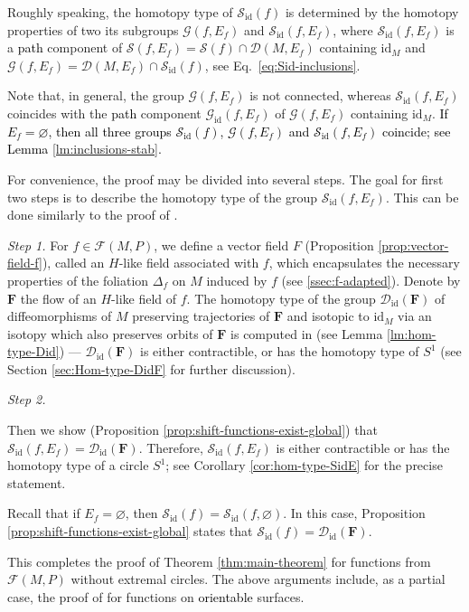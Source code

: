 \documentclass[10pt,reqno]{amsart}
\newcommand{\bfF}{\mathbf{F}}
\newcommand{\Sid}{\mathcal{S}_{\id}(f)}
\newcommand{\F}{\mathcal{F}(M,P)}
\newcommand{\id}{\mathrm{id}}
\newcommand{\textr}[1]{\textcolor{black}{#1}}
\begin{document}
{Roughly speaking, the homotopy type of $\Sid$ is determined by the homotopy properties of  two its subgroups
$\mathcal{G}(f,E_f)$ and $\mathcal{S}_{\id}(f,E_f)$, where $\mathcal{S}_{\id}(f,E_f)$ is a \textr{path} component of $\mathcal{S}(f,E_f) = \mathcal{S}(f)\cap \mathcal{D}(M,E_f)$ containing $\id_M$ and $\mathcal{G}(f,E_f) = \mathcal{D}(M,E_f)\cap \Sid$, see Eq.~\eqref{eq:Sid-inclusions}.}


Note that, in general, the group   $\mathcal{G}(f,E_f)$  is  not  connected, whereas  $\mathcal{S}_{\id}(f, E_f)$ coincides with the \textr{path} component  $\mathcal{G}_{\id}(f,E_f)$ of $\mathcal{G}(f,E_f)$ containing $\id_{M}$.
\textr{ If $E_f = \varnothing$, then all three groups $\mathcal{S}_{\id}(f)$, $\mathcal{G}(f,E_f)$ and $\mathcal{S}_{\id}(f,E_f)$ coincide; see Lemma \ref{lm:inclusions-stab}.}

For convenience, the proof may be divided into several steps. 
The goal for first two steps is to describe the homotopy type of the group $\mathcal{S}_{\id}(f,E_f)$. This can be done similarly to the proof of \cite[Theorem 1.3]{Maksymenko:AGAG:2006}.



{\it Step 1.}  
For $f\in \F$, we define a vector field $F$ (Proposition \ref{prop:vector-field-f}), called an $H$-like field associated with $f$, which encapsulates the necessary properties of the foliation $\Delta_f$ on $M$ induced by $f$ (see \textsection\ref{ssec:f-adapted}). Denote by $\bfF$ the flow of an $H$-like field of $f$.
{The homotopy type of the group $\mathcal{D}_{\id}(\bfF)$ of  diffeomorphisms of $M$ preserving trajectories of $\bfF$ and  isotopic to $\id_M$ via an isotopy which also preserves orbits of $\bfF$ is computed in  \cite[Theorem 3.5]{Maksymenko:OsakaJM:2011} (see Lemma \ref{lm:hom-type-Did}) --- $\mathcal{D}_{\id}(\bfF)$  is either contractible, or has the homotopy type of $S^1$ (see Section \ref{sec:Hom-type-DidF} for further discussion).}


{\it Step 2.}
{Then we  show (Proposition \ref{prop:shift-functions-exist-global}) that $\mathcal{S}_{\id}(f,E_f) = \mathcal{D}_{\id}(\bfF)$. Therefore, $\mathcal{S}_{\id}(f,E_f) $ is either contractible or has the homotopy type of a circle $S^1$; see Corollary \ref{cor:hom-type-SidE} for the precise statement.

Recall that if $E_f = \varnothing$, then $\mathcal{S}_{\mathrm{id}}(f) = \mathcal{S}_{\mathrm{id}}(f,\varnothing)$. In this case, Proposition \ref{prop:shift-functions-exist-global} states that $\mathcal{S}_{\mathrm{id}}(f) = \mathcal{D}_{\mathrm{id}}(\mathbf{F})$.}
 This  completes the proof of Theorem \ref{thm:main-theorem} for functions from $\F$ without extremal circles. The above arguments include, as a partial case, the proof of \cite[Theorem 1.3]{Maksymenko:AGAG:2006} for  functions on \textr{orientable} surfaces.
\end{document}
